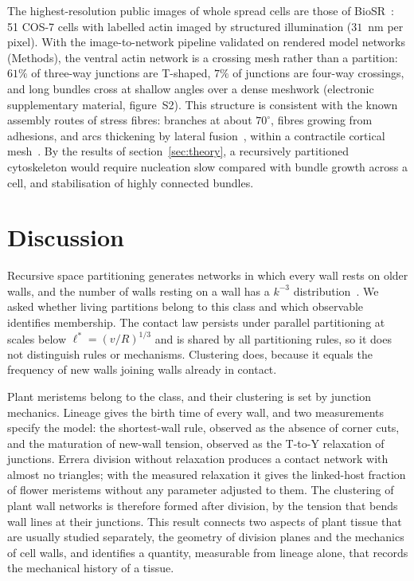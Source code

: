 \documentclass[11pt,a4paper]{article}
\begin{document}
The highest-resolution public images of whole spread cells are those of BioSR~\cite{qiao2021}:
51 COS-7 cells with labelled actin imaged by structured illumination ($31$~nm per pixel). With
the image-to-network pipeline validated on rendered model networks (Methods), the ventral actin
network is a crossing mesh rather than a partition: $61\%$ of three-way junctions are T-shaped,
$7\%$ of junctions are four-way crossings, and long bundles cross at shallow angles over a dense
meshwork (electronic supplementary material, figure~S2). This structure is consistent with the
known assembly routes of stress fibres: branches at about $70^\circ$, fibres growing from
adhesions, and arcs thickening by lateral fusion~\cite{tojkander2015}, within a contractile
cortical mesh~\cite{vignaud2021}. By the results of section~\ref{sec:theory}, a recursively
partitioned cytoskeleton would require nucleation slow compared with bundle growth across a
cell, and stabilisation of highly connected bundles.

\section{Discussion}

Recursive space partitioning generates networks in which every wall rests on older walls, and
the number of walls resting on a wall has a $k^{-3}$
distribution~\cite{vazquez2026sr,vazquez2026div}. We asked whether living partitions belong to
this class and which observable identifies membership. The contact law persists under parallel
partitioning at scales below $\ell^*=(v/R)^{1/3}$ and is shared by all partitioning rules, so it
does not distinguish rules or mechanisms. Clustering does, because it equals the frequency of
new walls joining walls already in contact.

Plant meristems belong to the class, and their clustering is set by junction mechanics.
Lineage gives the birth time of every wall, and two measurements specify the model: the
shortest-wall rule, observed as the absence of corner cuts, and the maturation of new-wall
tension, observed as the T-to-Y relaxation of junctions. Errera division without relaxation
produces a contact network with almost no triangles; with the measured relaxation it gives the
linked-host fraction of flower meristems without any parameter adjusted to them. The
clustering of plant wall networks is therefore formed after division, by the tension that bends
wall lines at their junctions. This result connects two aspects of plant tissue that are
usually studied separately, the geometry of division planes and the mechanics of cell walls,
and identifies a quantity, measurable from lineage alone, that records the mechanical history
of a tissue.
\end{document}
